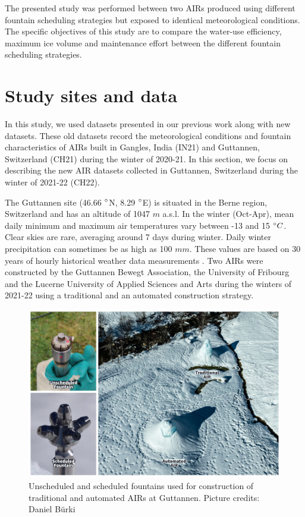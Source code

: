 \documentclass[tc, manuscript]{copernicus}
\begin{document}
The presented study was performed between two AIRs produced using different fountain scheduling strategies but
exposed to identical meteorological conditions. The specific objectives of this study are to compare the
water-use efficiency, maximum ice volume and maintenance effort between the different fountain scheduling
strategies.

\section{Study sites and data}

In this study, we used datasets presented in our previous work
\citep{balasubramanianInfluenceMeteorologicalConditions2022} along with new datasets. These old datasets record
the meteorological conditions and fountain characteristics of AIRs built in Gangles, India (IN21) and Guttannen,
Switzerland (CH21) during the winter of 2020-21. In this section, we focus on describing the new AIR datasets
collected in Guttannen, Switzerland during the winter of 2021-22 (CH22).

The Guttannen site (46.66 $^{\circ}$N, 8.29 $^{\circ}$E) is situated in the Berne region, Switzerland and has an
altitude of 1047 $m$ a.s.l. In the winter (Oct-Apr), mean daily minimum and maximum air temperatures vary
between -13 and 15 $^{\circ} C$. Clear skies are rare, averaging around 7 days during winter. Daily winter
precipitation can sometimes be as high as 100 $mm$. These values are based on 30 years of hourly historical
weather data measurements \citep{meteoblueClimateGuttannen2021}. Two AIRs were constructed by the Guttannen
Bewegt Association, the University of Fribourg and the Lucerne University of Applied Sciences and Arts during
the winters of 2021-22 using a traditional and an automated construction strategy.

\begin{figure}[t]
\includegraphics[width=12cm]{Figures/AIR_fountains.jpg}
\caption{Unscheduled and scheduled fountains used for construction of traditional and automated AIRs at Guttannen. Picture credits: Daniel Bürki}
\label{fig:2AIR}
\end{figure}
\end{document}
